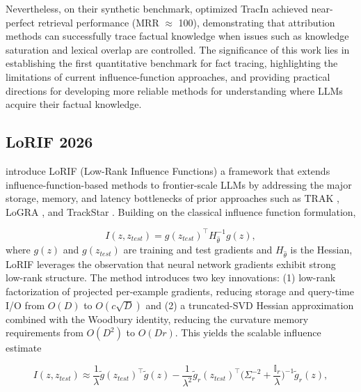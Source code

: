 \documentclass{article}
\newcommand{\Hh}{H_{\hat{\theta}}}              %
\newcommand{\gr}[1]{g(#1)}                      %
\newcommand{\gt}[1]{\tilde{g}(#1)}              %
\newcommand{\gtr}[1]{\tilde{g}_r(#1)}           %
\begin{document}
Nevertheless, on their synthetic benchmark, optimized TracIn achieved near-perfect retrieval performance (MRR $\approx$ 100), demonstrating that attribution methods can successfully trace factual knowledge when issues such as knowledge saturation and lexical overlap are controlled. The significance of this work lies in establishing the first quantitative benchmark for fact tracing, highlighting the limitations of current influence-function approaches, and providing practical directions for developing more reliable methods for understanding where LLMs acquire their factual knowledge.

\subsection{LoRIF 2026}
\textcite{loRIF} introduce LoRIF (Low-Rank Influence Functions) a framework that extends influence-function-based methods to frontier-scale LLMs by addressing the major storage, memory, and latency bottlenecks of prior approaches such as TRAK \parencite{trak}, LoGRA \parencite{logra}, and TrackStar \parencite{trackstar}. Building on the classical influence function formulation,

\begin{equation}\label{eq:lit-lorif-if}
    I(z,z_{test}) = \gr{z_{test}}^\top\Hh^{-1}\gr{z},
\end{equation}
where $\gr{z}$ and $\gr{z_{test}}$ are training and test gradients and $\Hh$ is the Hessian, LoRIF leverages the observation that neural network gradients exhibit strong low-rank structure. The method introduces two key innovations: (1) low-rank factorization of projected per-example gradients, reducing storage and query-time I/O from $O(D)$ to $O(c\sqrt{D})$ and (2) a truncated-SVD Hessian approximation combined with the Woodbury identity, reducing the curvature memory requirements from $O(D^2)$ to $O(Dr)$. This yields the scalable influence estimate

\begin{equation}\label{eq:lit-lorif}
    I(z,z_{test}) \approx \frac{1}{\lambda} \gt{z_{test}}^\top \gt{z} - \frac{1}{\lambda^2} \gtr{z_{test}}^\top \Big(\Sigma_r^{-2} + \frac{\mathbb{I}_r}{\lambda}\Big)^{-1} \gtr{z},
\end{equation}
\end{document}
